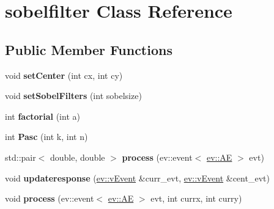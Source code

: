 \hypertarget{classsobelfilter}{}\section{sobelfilter Class Reference}
\label{classsobelfilter}
\subsection*{Public Member Functions}
\begin{DoxyCompactItemize}
\item 
void {\bfseries set\+Center} (int cx, int cy)\hypertarget{classsobelfilter_ab94731a7cf23f308ba8bff515e74da08}{}\label{classsobelfilter_ab94731a7cf23f308ba8bff515e74da08}

\item 
void {\bfseries set\+Sobel\+Filters} (int sobelsize)\hypertarget{classsobelfilter_a1e6e42100581b793b998f65584eae393}{}\label{classsobelfilter_a1e6e42100581b793b998f65584eae393}

\item 
int {\bfseries factorial} (int a)\hypertarget{classsobelfilter_a8798109157597bf1d7d61fc07e24022b}{}\label{classsobelfilter_a8798109157597bf1d7d61fc07e24022b}

\item 
int {\bfseries Pasc} (int k, int n)\hypertarget{classsobelfilter_ad0d85b5559661592e00d2c4bdee12725}{}\label{classsobelfilter_ad0d85b5559661592e00d2c4bdee12725}

\item 
std\+::pair$<$ double, double $>$ {\bfseries process} (ev\+::event$<$ \hyperlink{classev_1_1AddressEvent}{ev\+::\+AE} $>$ evt)\hypertarget{classsobelfilter_aee2b18b4f0481fb4d8421d7a2f6c478b}{}\label{classsobelfilter_aee2b18b4f0481fb4d8421d7a2f6c478b}

\item 
void {\bfseries updateresponse} (\hyperlink{classev_1_1vEvent}{ev\+::v\+Event} \&curr\+\_\+evt, \hyperlink{classev_1_1vEvent}{ev\+::v\+Event} \&cent\+\_\+evt)\hypertarget{classsobelfilter_adf809d93d1ebbd329f174e7eb5d30825}{}\label{classsobelfilter_adf809d93d1ebbd329f174e7eb5d30825}

\item 
void {\bfseries process} (ev\+::event$<$ \hyperlink{classev_1_1AddressEvent}{ev\+::\+AE} $>$ evt, int currx, int curry)\hypertarget{classsobelfilter_ae05de20a1e6691fa28658886c6bd9f74}{}\label{classsobelfilter_ae05de20a1e6691fa28658886c6bd9f74}


\end{DoxyCompactItemize}
